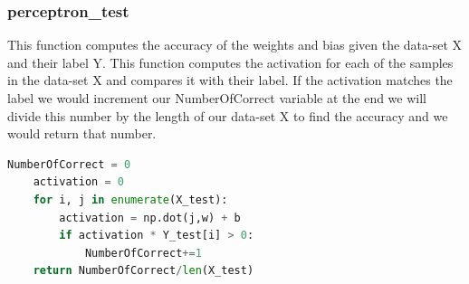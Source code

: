 \documentclass{article}
\begin{document}
	\subsubsection{perceptron\_test}
	This function computes the accuracy of the weights and bias given the data-set X and their label Y. This function computes the activation for each of the samples in the data-set X and compares it with their label. If the activation matches the label we would increment our NumberOfCorrect variable at the end we will divide this number by the length of our data-set X to find the accuracy and we would return that number. 
	\begin{lstlisting}[language=Python]
	NumberOfCorrect = 0
	activation = 0
	for i, j in enumerate(X_test):
		activation = np.dot(j,w) + b 
		if activation * Y_test[i] > 0:
			NumberOfCorrect+=1
	return NumberOfCorrect/len(X_test)
	\end{lstlisting}
	 
\end{document}
